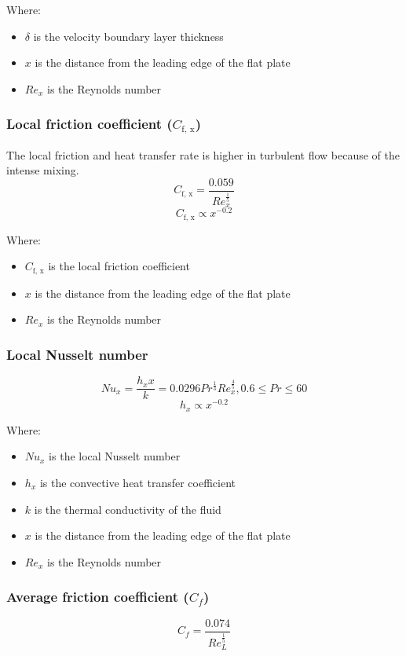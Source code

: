 \documentclass[11pt]{article}
\begin{document}
Where:
\begin{itemize}
\item \(\delta\) is the velocity boundary layer thickness
\item \(x\) is the distance from the leading edge of the flat plate
\item \(Re_x\) is the Reynolds number
\end{itemize}

\subsubsection{Local friction coefficient (\(C_{\text{f, x}}\))}
\label{sec:orge2ab246}
The local friction and heat transfer rate is higher in turbulent flow because of the intense mixing.
\[C_{\text{f, x}} = \frac{0.059}{Re_x^{\frac{1}{5}}}\]
\[C_{\text{f, x}} \propto x^{-0.2}\]

Where:
\begin{itemize}
\item \(C_{\text{f, x}}\) is the local friction coefficient
\item \(x\) is the distance from the leading edge of the flat plate
\item \(Re_x\) is the Reynolds number
\end{itemize}

\subsubsection{Local Nusselt number}
\label{sec:org746025c}
\[Nu_x = \frac{h_x x}{k} = 0.0296 Pr^{\frac{1}{3}} Re_x^{\frac{4}{5}}, 0.6 \le Pr \le 60\]
\[h_x \propto x^{-0.2}\]

Where:
\begin{itemize}
\item \(Nu_x\) is the local Nusselt number
\item \(h_x\) is the convective heat transfer coefficient
\item \(k\) is the thermal conductivity of the fluid
\item \(x\) is the distance from the leading edge of the flat plate
\item \(Re_x\) is the Reynolds number
\end{itemize}

\subsubsection{Average friction coefficient (\(C_f\))}
\label{sec:orgd6270a8}
\[C_f = \frac{0.074}{Re_L^{\frac{1}{5}}}\]
\end{document}
